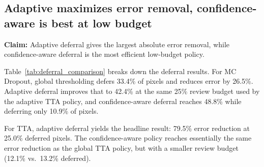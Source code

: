 \subsection{Adaptive maximizes error removal, confidence-aware is best at low budget}
\label{sec:results_deferral}

\textbf{Claim:} Adaptive deferral gives the largest absolute error removal,
while confidence-aware deferral is the most efficient low-budget policy.

Table~\ref{tab:deferral_comparison} breaks down the deferral results. For MC
Dropout, global thresholding defers 33.4\% of pixels and reduces error by
26.5\%. Adaptive deferral improves that to 42.4\% at the same 25\% review
budget used by the adaptive TTA policy, and confidence-aware deferral reaches
48.8\% while deferring only 10.9\% of pixels.

For TTA, adaptive deferral yields the headline result: 79.5\% error reduction
at 25.0\% deferred pixels. The confidence-aware policy reaches essentially the
same error reduction as the global TTA policy, but with a smaller review budget
(12.1\% vs.\ 13.2\% deferred).

\begin{table}[H]
\centering
\caption{Deferral strategy comparison on DRIVE test set. Error rates are
pixel-wise misclassification rates. Adaptive deferral maximizes absolute error
removal, while confidence-aware deferral gives the strongest reduction per
deferred percentage point at low review budgets.}
\label{tab:deferral_comparison}
\small
\setlength{\tabcolsep}{4.6pt}
\end{table}

